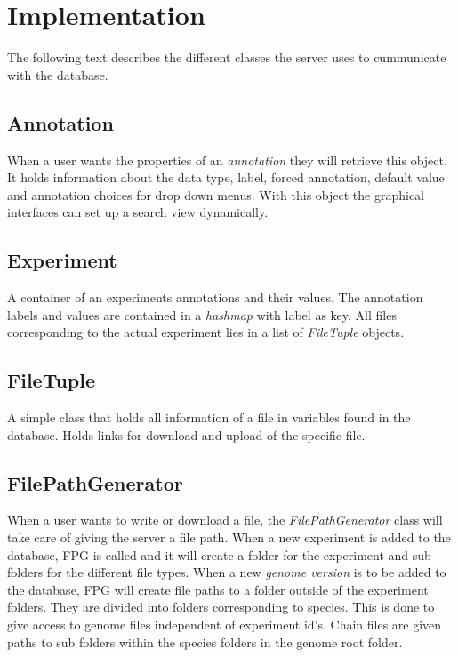 \documentclass[a4paper]{report}
\newcommand{\term}[1]{\textit{#1}}
\begin{document}
\section{Implementation}
The following text describes the different classes the server uses to cummunicate with the database.
\subsection{Annotation}
When a user wants the properties of an \term{annotation} they will retrieve this object. It holds information about the data type, label, forced annotation, default value and annotation choices for drop down menus. With this object the graphical interfaces can set up a search view dynamically.

\subsection{Experiment}
A container of an experiments annotations and their values. The annotation labels and values are contained in a \term{hashmap} with label as key. All files corresponding to the actual experiment lies in a list of \term{FileTuple} objects.

\subsection{FileTuple}
A simple class that holds all information of a file in variables found in the database. Holds links for download and upload of the specific file.

\subsection{FilePathGenerator}
When a user wants to write or download a file, the \term{FilePathGenerator} class will take care of giving the server a file path. When a new experiment is added to the database, FPG is called and it will create a folder for the experiment and sub folders for the different file types. When a new \term{genome version} is to be added to the database, FPG will create file paths to a folder outside of the experiment folders. They are divided into folders corresponding to species.  This is done to give access to genome files independent of experiment id's. Chain files are given paths to sub folders within the species folders in the genome root folder.
\end{document}
